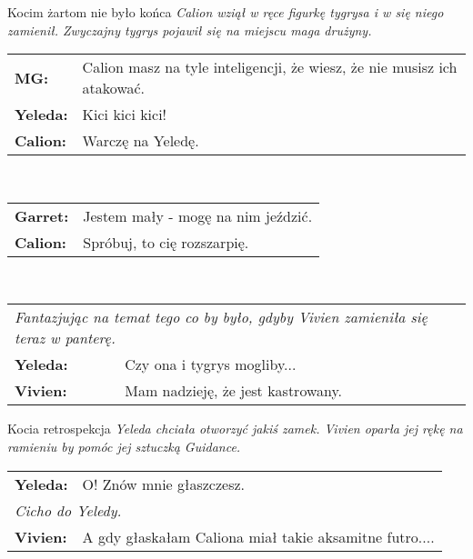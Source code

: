 \documentclass[10pt,twoside,twocolumn]{book}
\begin{document}
      
\begin{rpg-quotebox}{Kocim żartom nie było końca}
   \textit{Calion wziął w ręce figurkę tygrysa i w się niego zamienił. Zwyczajny tygrys pojawił się na miejscu maga drużyny.}\\

   \begin{tabularx}{\columnwidth}{lX}
      \textbf{MG:} & Calion masz na tyle inteligencji, że wiesz, że nie musisz ich atakować.\\
      \textbf{Yeleda:} & Kici kici kici!\\
      \textbf{Calion:} & Warczę na Yeledę.\\
   \end{tabularx}
   ~\newline\newline
   \begin{tabularx}{\columnwidth}{lX}
      \textbf{Garret:} & Jestem mały - mogę na nim jeździć.\\
      \textbf{Calion:} & Spróbuj, to cię rozszarpię.\\
   \end{tabularx}
   ~\newline\newline
   \begin{tabularx}{\columnwidth}{lX}
      \multicolumn{2}{X}{\textit{Fantazjując na temat tego co by było, gdyby Vivien zamieniła się teraz w panterę.}}\\
      
      \textbf{Yeleda:} & Czy ona i tygrys mogliby...\\
      \textbf{Vivien:} & Mam nadzieję, że jest kastrowany.\\
   \end{tabularx}
\end{rpg-quotebox}


\begin{rpg-quotebox}{Kocia retrospekcja}
   \textit{Yeleda chciała otworzyć jakiś zamek. Vivien oparła jej rękę na ramieniu by pomóc jej sztuczką Guidance.}\\
   
   \begin{tabularx}{\columnwidth}{lX}
      \textbf{Yeleda:} & O! Znów mnie głaszczesz.\\
      \multicolumn{2}{l}{\textit{Cicho do Yeledy.}}\\
      \textbf{Vivien:} & A gdy głaskałam Caliona miał takie aksamitne futro....\\
   \end{tabularx}
\end{rpg-quotebox}
\end{document}
